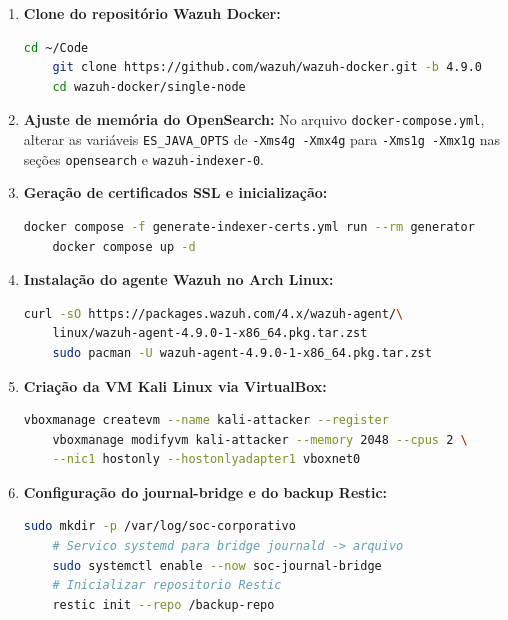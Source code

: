 \documentclass[12pt,a4paper]{article}
\begin{document}
    \begin{enumerate}
        \item \textbf{Clone do repositório Wazuh Docker:}
    \begin{lstlisting}[language=bash]
    cd ~/Code
    git clone https://github.com/wazuh/wazuh-docker.git -b 4.9.0
    cd wazuh-docker/single-node
    \end{lstlisting}

        \item \textbf{Ajuste de memória do OpenSearch:} No arquivo \texttt{docker-compose.yml}, alterar as variáveis \texttt{ES\_JAVA\_OPTS} de \texttt{-Xms4g -Xmx4g} para \texttt{-Xms1g -Xmx1g} nas seções \texttt{opensearch} e \texttt{wazuh-indexer-0}.

        \item \textbf{Geração de certificados SSL e inicialização:}
    \begin{lstlisting}[language=bash]
    docker compose -f generate-indexer-certs.yml run --rm generator
    docker compose up -d
    \end{lstlisting}

        \item \textbf{Instalação do agente Wazuh no Arch Linux:}
    \begin{lstlisting}[language=bash]
    curl -sO https://packages.wazuh.com/4.x/wazuh-agent/\
    linux/wazuh-agent-4.9.0-1-x86_64.pkg.tar.zst
    sudo pacman -U wazuh-agent-4.9.0-1-x86_64.pkg.tar.zst
    \end{lstlisting}

        \item \textbf{Criação da VM Kali Linux via VirtualBox:}
    \begin{lstlisting}[language=bash]
    vboxmanage createvm --name kali-attacker --register
    vboxmanage modifyvm kali-attacker --memory 2048 --cpus 2 \
    --nic1 hostonly --hostonlyadapter1 vboxnet0
    \end{lstlisting}

        \item \textbf{Configuração do journal-bridge e do backup Restic:}
    \begin{lstlisting}[language=bash]
    sudo mkdir -p /var/log/soc-corporativo
    # Servico systemd para bridge journald -> arquivo
    sudo systemctl enable --now soc-journal-bridge
    # Inicializar repositorio Restic
    restic init --repo /backup-repo
    \end{lstlisting}
    \end{enumerate}
\end{document}
